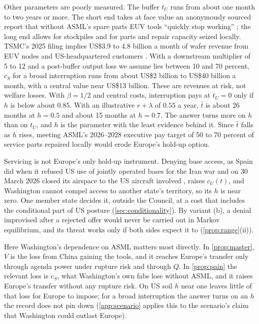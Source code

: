 Other parameters are poorly measured. The buffer $t_U$ runs from about one month to two years or more. The short end takes at face value an anonymously sourced report that without ASML's spare parts EUV tools ``quickly stop working'' \citep{bloomberg2024killswitch}; the long end allows for stockpiles and for parts and repair capacity seized locally. TSMC's 2025 filing implies US\$3.9 to 4.8 billion a month of wafer revenue from EUV nodes and US-headquartered customers \citep{tsmc2026annual}. With a downstream multiplier of 5 to 12 \citep{varas2021strengthening} and a post-buffer output loss we assume lies between 10 and 70 percent, $c_S$ for a broad interruption runs from about US\$2 billion to US\$40 billion a month, with a central value near US\$13 billion. These are revenues at risk, not welfare losses. With $\beta=1/2$ and central costs, interruption pays at $t_U=0$ only if $h$ is below about $0.85$. With an illustrative $r+\lambda$ of $0.55$ a year, $\bar t$ is about 26 months at $h=0.5$ and about 15 months at $h=0.7$. The answer turns more on $h$ than on $t_U$, and $h$ is the parameter with the least evidence behind it. Since $\bar t$ falls as $h$ rises, meeting ASML's 2026--2028 executive pay target of 50 to 70 percent of service parts repaired locally \citep{asml2026annual} would erode Europe's hold-up option.

Servicing is not Europe's only hold-up instrument. Denying base access, as Spain did when it refused US use of jointly operated bases for the Iran war and on 30 March 2026 closed its airspace to the US aircraft involved \citep{roque2026spain}, raises $c_U(t)$, and Washington cannot compel access to another state's territory, so its $h$ is near zero. One member state decides it, outside the Council, at a cost that includes the conditional part of US posture (\cref{sec:conditionality}). By variant (b), a denial improvised after a rejected offer would never be carried out in Markov equilibrium, and its threat works only if both sides expect it to (\cref{prop:range}(ii)).

Here Washington's dependence on ASML matters most directly. In \cref{prop:master}, $V$ is the loss from China gaining the tools, and it reaches Europe's transfer only through agenda power under rupture risk and through $Q$. In \cref{prop:pain} the relevant loss is $c_S$, what Washington's own fabs lose without ASML, and it raises Europe's transfer without any rupture risk. On US soil $h$ near one leaves little of that loss for Europe to impose; for a broad interruption the answer turns on an $h$ the record does not pin down (\cref{app:scenario} applies this to the scenario's claim that Washington could outlast Europe).

